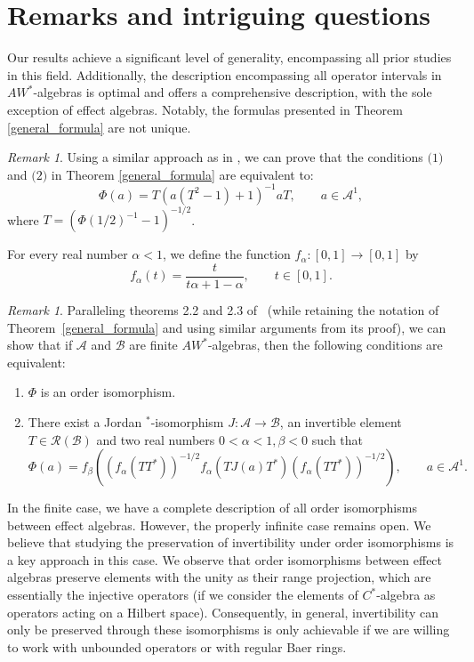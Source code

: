 \documentclass[12pt]{amsart}
\theoremstyle{definition}
\theoremstyle{remark}
\newtheorem{rem}[thm]{Remark}
\numberwithin{equation}{section}
\begin{document}
\section{Remarks and intriguing questions}\label{S6}


Our results achieve a significant level of generality, encompassing all prior studies in this field. Additionally, the description encompassing all operator intervals in  $AW^*$-algebras is optimal and offers a comprehensive description, with the sole exception of effect algebras.   Notably, the formulas presented in Theorem \ref{general_formula} are not unique.

\begin{rem}
Using a similar approach as in \cite[Theorem 2.2]{Our}, we can prove that the conditions $\textit{(1)}$  and  $\textit{(2)}$ in Theorem \ref{general_formula} are equivalent to:	 $$\Phi(a)=T\left( a(T^2-1)+1\right) ^{-1}aT, \qquad a\in\mathcal{A}^1,$$
where $T=(\Phi(1/2)^{-1}-1)^{-1/2}$.
\end{rem} 


For every real
number $\alpha < 1$, we define the function $f_{\alpha} : [0, 1] \to[0, 1]$ by
$$f_{\alpha}(t) = \dfrac{t}{t\alpha+1-\alpha}, \qquad t\in[0, 1].$$
\begin{rem}
Paralleling theorems 2.2 and 2.3 of~\cite{Semrl} (while retaining the notation of Theorem~\ref{general_formula} and using similar arguments from its proof), we can show that if $\mathcal{A}$ and $\mathcal{B}$ are finite $AW^*$-algebras, then the following conditions are equivalent:


\begin{enumerate}
	\item $\Phi$ is an order isomorphism.
	\item There exist a  Jordan $^*$-isomorphism $J:\mathcal{A}\to\mathcal{B}$,    an invertible element $T\in\mathcal{R(B)}$ and two real numbers $ 0 < \alpha < 1, \beta < 0$ such that $$\Phi(a)=f_{\beta}\left( (f_{\alpha}(TT^*))^{-1/2} f_{\alpha}(TJ(a)T^*) (f_{\alpha}(TT^*))^{-1/2}\right), \qquad a\in\mathcal{A}^{1}.$$
\end{enumerate} 	
\end{rem}	

In the finite case, we have a complete description of all order isomorphisms between effect algebras. However, the  properly infinite case remains open. We believe that studying the preservation of invertibility under order isomorphisms is a key approach in this case. We observe that order isomorphisms between effect algebras preserve elements with the unity as their range projection, which are essentially the injective operators (if we consider the elements of $C^*$-algebra as operators acting on a Hilbert space). Consequently, in general, invertibility can only be preserved through these isomorphisms is only achievable if we are willing to work with  unbounded operators or with regular Baer rings. 
\end{document}
